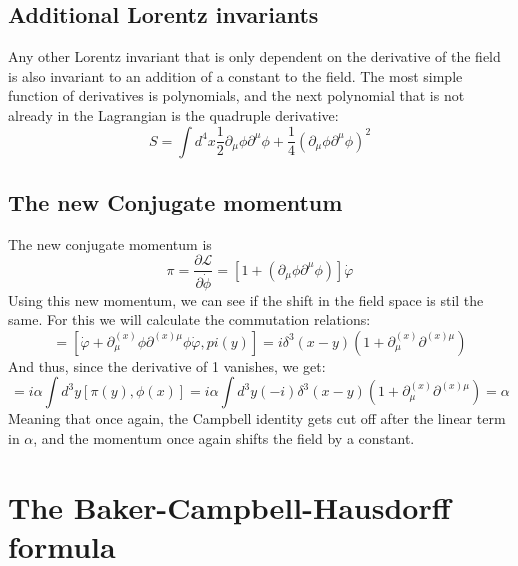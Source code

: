 \documentclass{article}
\begin{document}
\subsection{Additional Lorentz invariants}
Any other Lorentz invariant that is only dependent on the derivative of the field is also invariant to an addition of a constant to the field. The most simple function of derivatives is polynomials, and the next polynomial that is not already in the Lagrangian is the quadruple derivative:
\begin{equation}
    S = \int d^4x \frac{1}{2}\partial_\mu\phi\partial^\mu\phi + \frac{1}{4}\left(\partial_\mu\phi\partial^\mu\phi\right)^2
\end{equation}

\subsection{The new Conjugate momentum}
The new conjugate momentum is
\begin{equation}
    \pi = \frac{\partial \mathcal{L}}{\partial \dot{\phi}} = [1 + \left(\partial_\mu\phi\partial^\mu\phi\right)]\dot{\varphi}
\end{equation}
Using this new momentum, we can see if the shift in the field space is stil the same. For this we will calculate the commutation relations:
\begin{equation}
    [\phi(x),\pi(y)] = [\dot{\varphi} + \partial^{(x)}_\mu\phi\partial^{(x)\mu}\phi\dot{\varphi}, pi(y)] = i\delta^3(x-y)(1 + \partial^{(x)}_\mu \partial^{(x)\mu})
\end{equation}
And thus, since the derivative of 1 vanishes, we get:
\begin{equation}
    [i\alpha Q, \phi(x)] = i\alpha \int d^3y [\pi(y), \phi(x)] = i\alpha \int d^3y (-i)\delta^3(x - y)(1 + \partial^{(x)}_\mu \partial^{(x)\mu}) = \alpha
\end{equation}
Meaning that once again, the Campbell identity gets cut off after the linear term in $\alpha$, and the momentum once again shifts the field by a constant.

\section{The Baker-Campbell-Hausdorff formula}
\end{document}
